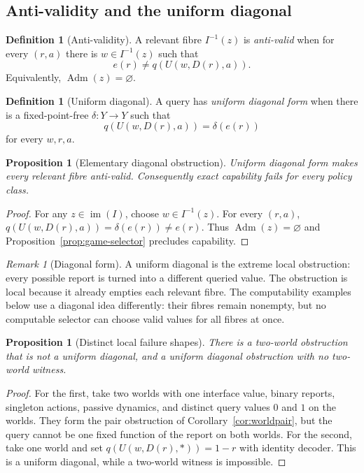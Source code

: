 \documentclass[11pt]{article}
\theoremstyle{plain}
\newtheorem{proposition}[theorem]{Proposition}
\theoremstyle{definition}
\newtheorem{definition}[theorem]{Definition}
\theoremstyle{remark}
\newtheorem{remark}[theorem]{Remark}
\newcommand{\im}{\operatorname{im}}
\newcommand{\Adm}{\operatorname{Adm}}
\begin{document}
\subsection{Anti-validity and the uniform diagonal}

\begin{definition}[Anti-validity]\label{def:antivalid}
A relevant fibre $I^{-1}(z)$ is \emph{anti-valid} when for every $(r,a)$ there
is $w\in I^{-1}(z)$ such that
\[
e(r)\ne q(U(w,D(r),a)).
\]
Equivalently, $\Adm(z)=\varnothing$.
\end{definition}

\begin{definition}[Uniform diagonal]\label{def:diag}
A query has \emph{uniform diagonal form} when there is a fixed-point-free
$\delta:Y\to Y$ such that
\[
q(U(w,D(r),a))=\delta(e(r))
\]
for every $w,r,a$.
\end{definition}

\begin{proposition}[Elementary diagonal obstruction]\label{prop:diagonal}
Uniform diagonal form makes every relevant fibre anti-valid. Consequently exact
capability fails for every policy class.
\end{proposition}

\begin{proof}
For any $z\in\im(I)$, choose $w\in I^{-1}(z)$. For every $(r,a)$,
$q(U(w,D(r),a))=\delta(e(r))\ne e(r)$. Thus $\Adm(z)=\varnothing$ and
Proposition~\ref{prop:game-selector} precludes capability.
\end{proof}

\begin{remark}[Diagonal form]
A uniform diagonal is the extreme local obstruction: every possible report is
turned into a different queried value. The obstruction is local because it
already empties each relevant fibre. The computability examples below use a
diagonal idea differently: their fibres remain nonempty, but no computable
selector can choose valid values for all fibres at once.
\end{remark}

\begin{proposition}[Distinct local failure shapes]\label{prop:failure-shapes}
There is a two-world obstruction that is not a uniform diagonal, and a uniform
diagonal obstruction with no two-world witness.
\end{proposition}

\begin{proof}
For the first, take two worlds with one interface value, binary reports,
singleton actions, passive dynamics, and distinct query values $0$ and $1$ on
the worlds. They form the pair obstruction of
Corollary~\ref{cor:worldpair}, but the query cannot be one fixed function of the
report on both worlds. For the second, take one world and set
$q(U(w,D(r),\ast))=1-r$ with identity decoder. This is a uniform diagonal, while
a two-world witness is impossible.
\end{proof}
\end{document}
